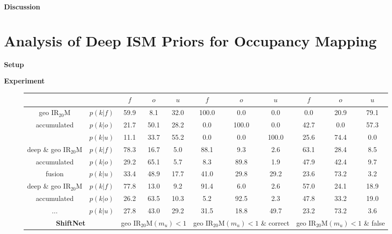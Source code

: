 \textbf{Discussion}
%
\section{Analysis of Deep ISM Priors for Occupancy Mapping}
\label{sec:exp_analyze_prior_properties}
\textbf{Setup}

\textbf{Experiment}
\begin{figure}[H]
\begin{center}
\begin{tabular}{c|c|ccc|ccc|ccc}
	&\backslashbox{}{\scriptsize{$k$}} & $f$ & $o$ & $u$ & $f$ & $o$ & $u$ & $f$ & $o$ & $u$\\
\hline
	geo IR$_{20}$M &$p(k|f)$ & \textcolor{mygreen}{59.9} & \textcolor{myred}{8.1} & 32.0& \textcolor{mygreen}{100.0} & \textcolor{myred}{0.0} & 0.0& \textcolor{mygreen}{0.0} & \textcolor{myred}{20.9} & 79.1 \\
	accumulated &$p(k|o)$ & \textcolor{myred}{21.7} & \textcolor{mygreen}{50.1} & 28.2& \textcolor{myred}{0.0} & \textcolor{mygreen}{100.0} & 0.0& \textcolor{myred}{42.7} & \textcolor{mygreen}{0.0} & 57.3 \\
	&$p(k|u)$ & 11.1 & 33.7 & 55.2& 0.0 & 0.0 & 100.0& 25.6 & 74.4 & 0.0 \\
\hline
	deep \& geo IR$_{20}$M &$p(k|f)$ & \textcolor{mygreen}{78.3} & \textcolor{myred}{16.7} & 5.0& \textcolor{mygreen}{88.1} & \textcolor{myred}{9.3} & 2.6& \textcolor{mygreen}{63.1} & \textcolor{myred}{28.4} & 8.5 \\
	accumulated &$p(k|o)$ & \textcolor{myred}{29.2} & \textcolor{mygreen}{65.1} & 5.7& \textcolor{myred}{8.3} & \textcolor{mygreen}{89.8} & 1.9& \textcolor{myred}{47.9} & \textcolor{mygreen}{42.4} & 9.7 \\
	fusion &$p(k|u)$ & 33.4 & 48.9 & 17.7& 41.0 & 29.8 & 29.2& 23.6 & 73.2 & 3.2 \\
\hline
	deep \& geo IR$_{20}$M &$p(k|f)$ & \textcolor{mygreen}{77.8} & \textcolor{myred}{13.0} & 9.2& \textcolor{mygreen}{91.4} & \textcolor{myred}{6.0} & 2.6& \textcolor{mygreen}{57.0} & \textcolor{myred}{24.1} & 18.9 \\
	accumulated &$p(k|o)$ & \textcolor{myred}{26.2} & \textcolor{mygreen}{63.5} & 10.3& \textcolor{myred}{5.2} & \textcolor{mygreen}{92.5} & 2.3& \textcolor{myred}{47.8} & \textcolor{mygreen}{33.2} & 19.0 \\
	...&$p(k|u)$ & 27.8 & 43.0 & 29.2& 31.5 & 18.8 & 49.7& 23.2 & 73.2 & 3.6 \\
\hline
	\multicolumn{2}{c|}{\textbf{ShiftNet}} & \multicolumn{3}{c|}{\scriptsize{geo IR$_{20}$M$(m_u) < 1$}} & \multicolumn{3}{c|}{\scriptsize{geo IR$_{20}$M$(m_u) < 1$ \& correct}} & \multicolumn{3}{c}{\scriptsize{geo IR$_{20}$M$(m_u) < 1$ \& false}} 
\end{tabular}
\caption{\label{fig:quant_analysis_of_prior}}
\end{center}
\end{figure}
